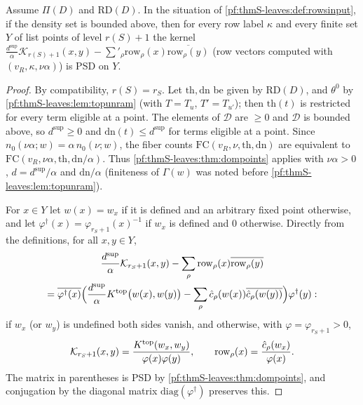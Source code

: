 \begin{proposition}\label{pf:thmS-leaves:prop:domlists}
Assume $\Pi(D)$ and $\mathrm{RD}(D)$. In the situation of \cref{pf:thmS-leaves:def:rowsinput}, if the density set is
bounded above, then for every row label $\kappa$ and every finite set $Y$ of list points of level $r(S)+1$ the kernel
$\frac{d^{\sup}}{\alpha}\mathcal K_{r(S)+1}(x,y)-\sum'_\rho\mathrm{row}_\rho(x)\overline{\mathrm{row}_\rho(y)}$ (row vectors computed with
$(v_R,\kappa,\nu\alpha)$) is PSD on $Y$.
\end{proposition}

\begin{proof}
By compatibility, $r(S)=r_S$. Let $\mathrm{th},\mathrm{dn}$ be given by $\mathrm{RD}(D)$, and $\theta^0$ by
\cref{pf:thmS-leaves:lem:topunram} (with $T=T_u$, $T'=T_{u'}$); then $\mathrm{th}(t)$ is restricted for every term eligible at a
point. The elements of $\mathcal D$ are $\ge0$ and $\mathcal D$ is bounded above, so $d^{\sup}\ge0$ and $\mathrm{dn}(t)\le d^{\sup}$ for
terms eligible at a point. Since $n_0(\nu\alpha;w)=\alpha\,n_0(\nu;w)$, the fiber counts $\mathrm{FC}(v_R,\nu,\mathrm{th},\mathrm{dn})$
are equivalent to $\mathrm{FC}(v_R,\nu\alpha,\mathrm{th},\mathrm{dn}/\alpha)$. Thus \cref{pf:thmS-leaves:thm:dompoints} applies with
$\nu\alpha>0$, $d=d^{\sup}/\alpha$ and $\mathrm{dn}/\alpha$ (finiteness of $\Gamma(w)$ was noted before
\cref{pf:thmS-leaves:lem:topunram}).

For $x\in Y$ let $w(x)=w_x$ if it is defined and an arbitrary fixed point otherwise, and let
$\varphi^\dagger(x)=\varphi_{r_S+1}(x)^{-1}$ if $w_x$ is defined and $0$ otherwise. Directly from the definitions, for all
$x,y\in Y$,
\begin{multline*}
\frac{d^{\sup}}{\alpha}\mathcal K_{r_S+1}(x,y)-\sum_\rho\mathrm{row}_\rho(x)\overline{\mathrm{row}_\rho(y)}\\
=\overline{\varphi^\dagger(x)}\Bigl(\frac{d^{\sup}}{\alpha}K^{\mathrm{top}}\bigl(w(x),w(y)\bigr)
-\sum_\rho\hat c_\rho(w(x))\overline{\hat c_\rho(w(y))}\Bigr)\varphi^\dagger(y):
\end{multline*}
if $w_x$ (or $w_y$) is undefined both sides vanish, and otherwise, with $\varphi=\varphi_{r_S+1}>0$,
\[
\mathcal K_{r_S+1}(x,y)=\frac{K^{\mathrm{top}}(w_x,w_y)}{\varphi(x)\varphi(y)},\qquad \mathrm{row}_\rho(x)=\frac{\hat c_\rho(w_x)}{\varphi(x)}.
\]
The matrix in parentheses is PSD by \cref{pf:thmS-leaves:thm:dompoints}, and conjugation by the diagonal matrix
$\mathrm{diag}(\varphi^\dagger)$ preserves this.
\end{proof}

